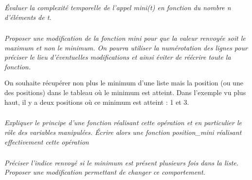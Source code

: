 \documentclass[10pt]{article}
\newif\ifprof
\begin{document}
\subparagraph{}
\textit{Évaluer la complexité temporelle de l’appel \textsf{mini(t)} en fonction du nombre \textsf{n} d’éléments de \textsf{t}.}
\ifprof
\begin{corrige}
Au cours de l'algorithme, on parcourt une seule fois chacune des valeurs de la liste. La complexité de l'opération de recherche du minimum est donc linéaire $\mathcal{O}(n)$.
\end{corrige}
\else
\fi


\subparagraph{}
\textit{Proposer une modification de la fonction \textsf{mini} pour que la valeur renvoyée soit le maximum et
non le minimum. On pourra utiliser la numérotation des lignes pour préciser le lieu d’éventuelles
modifications et ainsi éviter de réécrire toute la fonction.}
\ifprof
\begin{corrige}
La ligne 7 peut être remplacée par \textsf{if t[i] >= p:}.
\end{corrige}
\else
\fi

On souhaite récupérer non plus le minimum d’une liste mais la position (ou une des positions) dans le tableau où le
minimum est atteint. Dans l’exemple vu plus haut, il y a deux positions où ce minimum est atteint : 1 et 3.


\subparagraph{}
\textit{Expliquer le principe d’une fonction réalisant cette opération et en particulier le rôle des variables
manipulées. Écrire alors une fonction \textsf{position\_mini} réalisant effectivement cette opération}
\ifprof
\begin{corrige}

Il ne faut plus stocker la valeur minimale mais l'indice de la valeur minimale dans la liste.

\begin{py}
\begin{python}
def position_mini(t):
    """Calcule l'indice du minimum d'un tableau d'entiers 
    ou de flottants."""
    if len(t) == 0:
        return None
    p = 0
    for i in range(len(t)):
    # Ou for i in range(1,len(t)):
        if t[i] <= t[p]:
            p = i
    return p
\end{python}
\end{py}

\end{corrige}
\else
\fi


\subparagraph{}
\textit{Préciser l’indice renvoyé si le minimum est présent plusieurs fois dans la liste.
Proposer une modification permettant de changer ce comportement.}
\ifprof
\begin{corrige}
Dans la question précédente, l'indice renvoyé est l'indice de la dernière valeur rencontrée.

Si on souhaite retourner le premier indice, il faut utiliser une inégalité stricte : \textsf{if t[i] <= p:}.
\end{corrige}
\else
\fi
\end{document}
